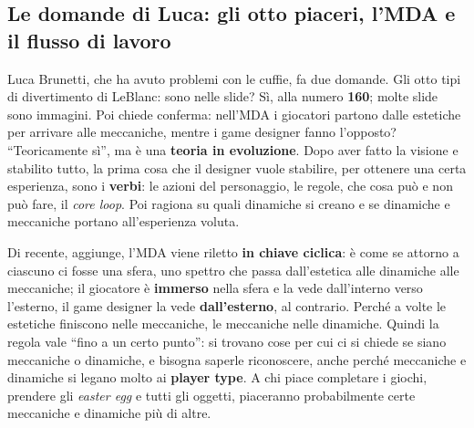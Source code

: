 \subsection{Le domande di Luca: gli otto piaceri, l'MDA e il flusso di lavoro}

Luca Brunetti, che ha avuto problemi con le cuffie, fa due domande. Gli otto
tipi di divertimento di LeBlanc: sono nelle slide? Sì, alla numero
\textbf{160}; molte slide sono immagini. Poi chiede conferma: nell'MDA i
giocatori partono dalle estetiche per arrivare alle meccaniche, mentre i game
designer fanno l'opposto? ``Teoricamente sì'', ma è una \textbf{teoria in
evoluzione}. Dopo aver fatto la visione e stabilito tutto, la prima cosa che il
designer vuole stabilire, per ottenere una certa esperienza, sono i
\textbf{verbi}: le azioni del personaggio, le regole, che cosa può e non può fare,
il \emph{core loop}. Poi ragiona su quali dinamiche si creano e se dinamiche e
meccaniche portano all'esperienza voluta.

Di recente, aggiunge, l'MDA viene riletto \textbf{in chiave ciclica}: è come se
attorno a ciascuno ci fosse una sfera, uno spettro che passa dall'estetica alle
dinamiche alle meccaniche; il giocatore è \textbf{immerso} nella sfera e la vede
dall'interno verso l'esterno, il game designer la vede \textbf{dall'esterno}, al
contrario. Perché a volte le estetiche finiscono nelle meccaniche, le meccaniche
nelle dinamiche. Quindi la regola vale ``fino a un certo punto'': si trovano cose
per cui ci si chiede se siano meccaniche o dinamiche, e bisogna saperle
riconoscere, anche perché meccaniche e dinamiche si legano molto ai
\textbf{player type}. A chi piace completare i giochi, prendere gli
\emph{easter egg} e tutti gli oggetti, piaceranno probabilmente certe meccaniche
e dinamiche più di altre.

